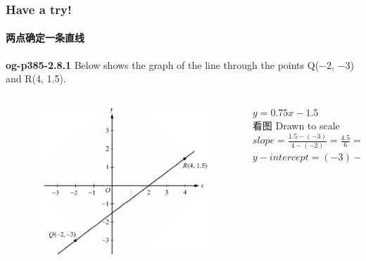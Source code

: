 \documentclass[
	11pt, %
	handout,
]{beamer}
\begin{document}

\begin{frame}
	\frametitle{Have a try!}
	\framesubtitle{两点确定一条直线}
	\textbf{og-p385-2.8.1}
	Below shows the graph of the line through the points Q(−2, −3) and R(4, 1.5).

	\begin{columns}[t] 
		\begin{column}{0.6\textwidth} %
			\begin{figure}
		    \includegraphics[width=\linewidth]{Linear_Function_Example_Question_1.png}
	   \end{figure}
		\end{column}
		\begin{column}{0.4\textwidth} %
		\pause
		$y = 0.75x - 1.5$ \\ 看图 Drawn to scale \\
		\bigskip
		$slope = \frac{1.5 -(-3) }{4- (-2)} = \frac{4.5}{6} = \frac{3}{4} = 0.75$ \\
		$y-intercept= (-3) - 0.75  \times (-2) = -1.5$\\
    \end{column}
	\end{columns}
\end{frame}

\end{document}
